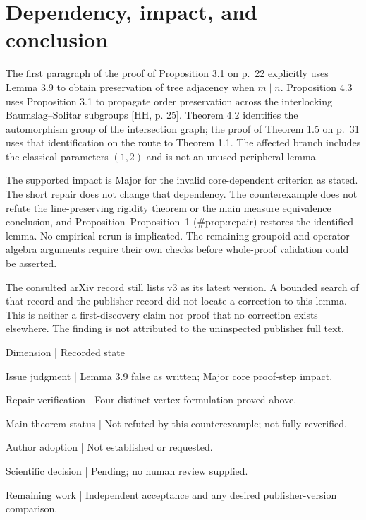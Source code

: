 \documentclass[10pt]{article}
\begin{document}
\section*{Dependency, impact, and conclusion}
The first paragraph of the proof of Proposition 3.1 on p. 22 explicitly uses Lemma 3.9 to obtain preservation of tree adjacency when \(m\mid n\). Proposition 4.3 uses Proposition 3.1 to propagate order preservation across the interlocking Baumslag–Solitar subgroups [HH, p. 25]. Theorem 4.2 identifies the automorphism group of the intersection graph; the proof of Theorem 1.5 on p. 31 uses that identification on the route to Theorem 1.1. The affected branch includes the classical parameters \((1,2)\) and is not an unused peripheral lemma.\par
The supported impact is Major for the invalid core-dependent criterion as stated. The short repair does not change that dependency. The counterexample does not refute the line-preserving rigidity theorem or the main measure equivalence conclusion, and Proposition Proposition 1 (\#prop:repair) restores the identified lemma. No empirical rerun is implicated. The remaining groupoid and operator-algebra arguments require their own checks before whole-proof validation could be asserted.\par
The consulted arXiv record still lists v3 as its latest version. A bounded search of that record and the publisher record did not locate a correction to this lemma. This is neither a first-discovery claim nor proof that no correction exists elsewhere. The finding is not attributed to the uninspected publisher full text.\par
Dimension | Recorded state\par
Issue judgment | Lemma 3.9 false as written; Major core proof-step impact.\par
Repair verification | Four-distinct-vertex formulation proved above.\par
Main theorem status | Not refuted by this counterexample; not fully reverified.\par
Author adoption | Not established or requested.\par
Scientific decision | Pending; no human review supplied.\par
Remaining work | Independent acceptance and any desired publisher-version comparison.\par
\end{document}
